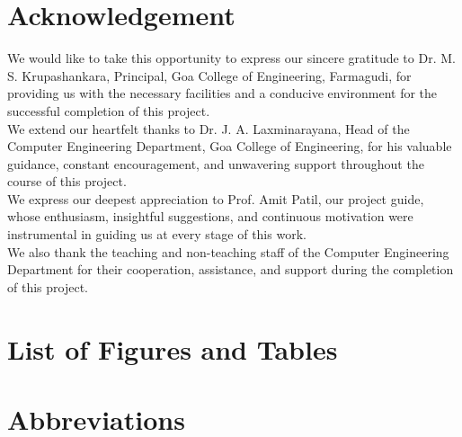 \documentclass[12pt,a4paper]{report}
\begin{document}
\chapter*{Acknowledgement}

We would like to take this opportunity to express our sincere gratitude to 
Dr. M. S. Krupashankara, Principal, Goa College of Engineering, Farmagudi, 
for providing us with the necessary facilities and a conducive environment 
for the successful completion of this project.\\[0.1cm]

We extend our heartfelt thanks to Dr. J. A. Laxminarayana, Head of the 
Computer Engineering Department, Goa College of Engineering, for his 
valuable guidance, constant encouragement, and unwavering support 
throughout the course of this project.\\[0.1cm]

We express our deepest appreciation to Prof. Amit Patil, our project guide, 
whose enthusiasm, insightful suggestions, and continuous motivation were 
instrumental in guiding us at every stage of this work.\\[0.1cm]

We also thank the teaching and non-teaching staff of the Computer Engineering 
Department for their cooperation, assistance, and support during the 
completion of this project.


\chapter*{List of Figures and Tables}

\section*{}
\listoffigures

\section*{}
\listoftables
\chapter*{Abbreviations}
\end{document}
